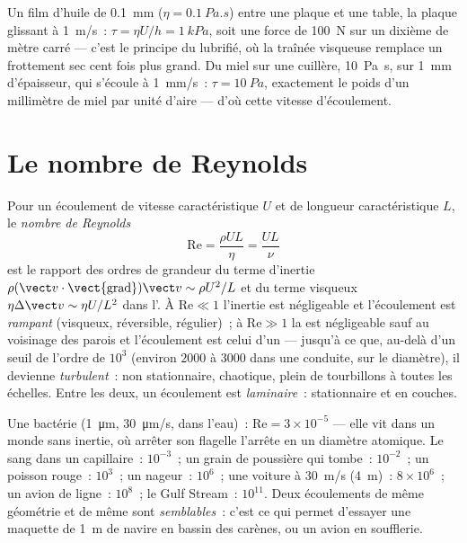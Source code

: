 \begin{example}\label{ex:b2:viscous-flows:table}
Un film d'huile de \qty{0.1}{mm} ($\eta = \qty{0.1}{Pa.s}$) entre une plaque et une
table, la plaque glissant à \qty{1}{m/s}~: $\tau = \eta U/h = \qty{1}{kPa}$, soit une
force de \qty{100}{N} sur un dixième de mètre carré --- c'est le principe du
 lubrifié, où la traînée visqueuse remplace un frottement sec
cent fois plus grand. Du miel sur une cuillère, \qty{10}{Pa.s}, sur \qty{1}{mm} d'épaisseur,
qui s'écoule à \qty{1}{mm/s}~: $\tau = \qty{10}{Pa}$, exactement le poids d'un
millimètre de miel par unité d'aire --- d'où cette vitesse d'écoulement.
\end{example}

\section{Le nombre de Reynolds}

\begin{definition}\label{def:b2:viscous-flows:reynolds}
Pour un écoulement de vitesse caractéristique $U$ et de longueur caractéristique $L$, le \emph{nombre
de Reynolds}
\[
\mathrm{Re} = \frac{\rho UL}{\eta} = \frac{UL}{\nu}
\]
est le rapport des ordres de grandeur du terme d'inertie
$\rho(\vect v\cdot\operatorname{\vect{grad}})\vect v \sim \rho U^2/L$ et du
terme visqueux $\eta\Delta\vect v \sim \eta U/L^2$ dans l'.
À $\mathrm{Re} \ll 1$ l'inertie est négligeable et l'écoulement est
\emph{rampant} (visqueux, réversible, régulier)~; à $\mathrm{Re} \gg 1$
la  est négligeable sauf au voisinage des parois et l'écoulement est celui d'un
 --- jusqu'à ce que, au-delà d'un seuil de l'ordre de $10^3$ (environ $2000$
à $3000$ dans une conduite, sur le diamètre), il devienne \emph{turbulent}~:
non stationnaire, chaotique, plein de tourbillons à toutes les échelles. Entre les deux, un
écoulement est \emph{laminaire}~: stationnaire et en couches.
\end{definition}

\begin{example}\label{ex:b2:viscous-flows:revalues}
Une bactérie (\qty{1}{\micro m}, \qty{30}{\micro m/s}, dans l'eau)~: $\mathrm{Re} =
3 \times 10^{-5}$ --- elle vit dans un monde sans inertie, où arrêter
son flagelle l'arrête en un diamètre atomique. Le sang dans un capillaire~:
$10^{-3}$~; un grain de poussière qui tombe~: $10^{-2}$~; un poisson rouge~: $10^3$~; un nageur~:
$10^6$~; une voiture à \qty{30}{m/s} (\qty{4}{m})~: $8 \times 10^6$~; un avion de ligne~: $10^8$~;
le Gulf Stream~: $10^{11}$. Deux écoulements de même géométrie et de même
 sont \emph{semblables}~: c'est ce qui permet d'essayer une maquette de \qty{1}{m}
de navire en bassin des carènes, ou un avion en soufflerie.
\end{example}

